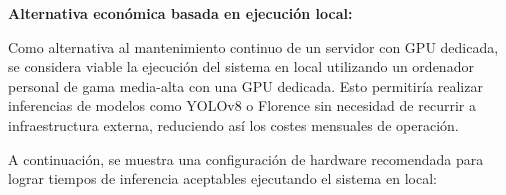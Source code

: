 \begin{table}[H]
	\centering
	\renewcommand{\arraystretch}{1.5}
	\caption{Costes asociados al uso de APIs comerciales de modelos LLM}
	\label{tab:coste_llm}
\end{table}


\begin{table}[H]
	\centering
	\renewcommand{\arraystretch}{1.5}
	\caption{Otros costes estimados para desarrollo y operación}
	\label{tab:coste_otros}
\end{table}

\textbf{Alternativa económica basada en ejecución local:}

Como alternativa al mantenimiento continuo de un servidor con GPU dedicada, se considera viable la ejecución del sistema en local utilizando un ordenador personal de gama media-alta con una GPU dedicada. Esto permitiría realizar inferencias de modelos como YOLOv8 o Florence sin necesidad de recurrir a infraestructura externa, reduciendo así los costes mensuales de operación.

A continuación, se muestra una configuración de hardware recomendada para lograr tiempos de inferencia aceptables ejecutando el sistema en local:



